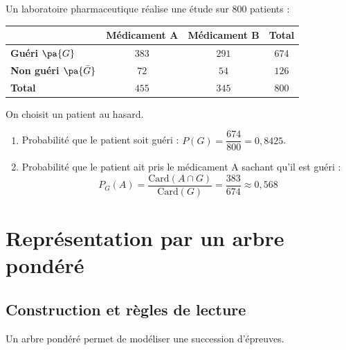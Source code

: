 \begin{methode}
	Un laboratoire pharmaceutique réalise une étude sur 800 patients :

	\begin{center}
		\def\arraystretch{1.5}
		\begin{tabular}{|l|c|c|c|} \hline
			                                  & \textbf{Médicament A} & \textbf{Médicament B} & \textbf{Total} \\ \hline
			\textbf{Guéri $\pa{G}$}           & $383$                 & $291$                 & $674$          \\ \hline
			\textbf{Non guéri $\pa{\bar{G}}$} & $72$                  & $54$                  & $126$          \\ \hline
			\textbf{Total}                    & $455$                 & $345$                 & $800$          \\ \hline
		\end{tabular}
	\end{center}

	On choisit un patient au hasard.
	\begin{enumerate}
		\item Probabilité que le patient soit guéri : $P(G) = \dfrac{674}{800} = 0,8425$.
		\item Probabilité que le patient ait pris le médicament A sachant qu'il est guéri :
		      \[
			      P_G(A) = \dfrac{\text{Card}(A \cap G)}{\text{Card}(G)} = \dfrac{383}{674} \approx 0,568
		      \]
	\end{enumerate}
\end{methode}

\section{Représentation par un arbre pondéré}

\subsection{Construction et règles de lecture}

Un arbre pondéré permet de modéliser une succession d'épreuves.

\begin{center}
\end{center}


